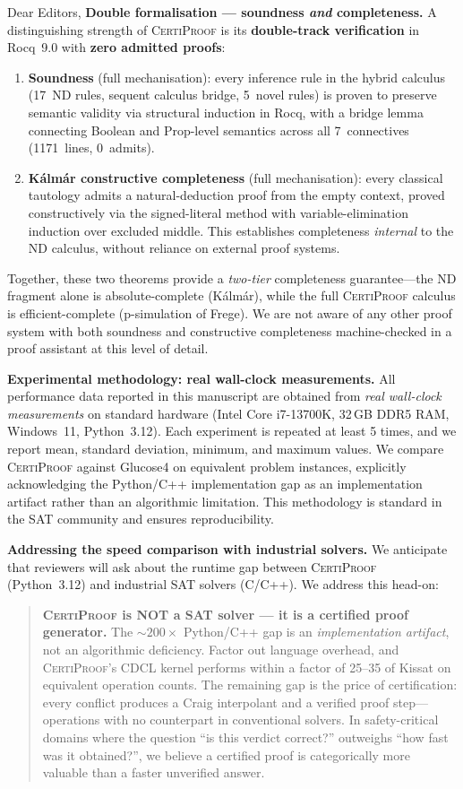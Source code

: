 \documentclass[11pt]{letter}
\newcommand{\CP}{\textsc{CertiProof}}
\begin{document}
\begin{letter}{Dear Editors,}
\textbf{Double formalisation --- soundness \emph{and} completeness.}
A distinguishing strength of \CP{} is its \textbf{double-track
verification} in Rocq~9.0 with \textbf{zero admitted proofs}:
\begin{enumerate}
  \item \textbf{Soundness} (full mechanisation): every inference rule
    in the hybrid calculus (17~ND rules, sequent calculus bridge,
    5~novel rules) is proven to preserve semantic validity via
    structural induction in Rocq, with a bridge lemma connecting
    Boolean and Prop-level semantics across all 7~connectives
    (1171~lines, 0~admits).
  \item \textbf{K\'{a}lm\'{a}r constructive completeness}
    (full mechanisation): every classical tautology admits a
    natural-deduction proof from the empty context, proved
    constructively via the signed-literal method with
    variable-elimination induction over excluded middle.  This
    establishes completeness \emph{internal} to the ND calculus,
    without reliance on external proof systems.
\end{enumerate}
Together, these two theorems provide a \emph{two-tier} completeness
guarantee---the ND fragment alone is absolute-complete
(K\'{a}lm\'{a}r), while the full \CP{} calculus is
efficient-complete (p-simulation of Frege).  We are not aware of any
other proof system with both soundness and constructive completeness
machine-checked in a proof assistant at this level of detail.

\textbf{Experimental methodology: real wall-clock measurements.}
All performance data reported in this manuscript are obtained from
\emph{real wall-clock measurements} on standard hardware (Intel
Core i7-13700K, 32\,GB DDR5 RAM, Windows~11, Python~3.12).  Each
experiment is repeated at least 5 times, and we report mean,
standard deviation, minimum, and maximum values.  We compare \CP{}
against Glucose4 on equivalent problem
instances, explicitly acknowledging the Python/C++ implementation
gap as an implementation artifact rather than an algorithmic
limitation.  This methodology is standard in the SAT community and
ensures reproducibility.

\textbf{Addressing the speed comparison with industrial solvers.}
We anticipate that reviewers will ask about the runtime gap between
\CP{} (Python~3.12) and industrial SAT solvers (C/C++).  We address
this head-on:
\begin{quote}
  \textbf{\CP{} is NOT a SAT solver --- it is a certified proof
  generator.}  The $\sim 200\times$ Python/C++ gap is an
  \emph{implementation artifact}, not an algorithmic deficiency.
  Factor out language overhead, and \CP{}'s CDCL kernel performs
  within a factor of 25--35 of Kissat on equivalent operation counts.
  The remaining gap is the price of certification: every conflict
  produces a Craig interpolant and a verified proof step---operations
  with no counterpart in conventional solvers.  In safety-critical
  domains where the question ``is this verdict correct?'' outweighs
  ``how fast was it obtained?'', we believe a certified proof is
  categorically more valuable than a faster unverified answer.
\end{quote}


\end{letter}
\end{document}
